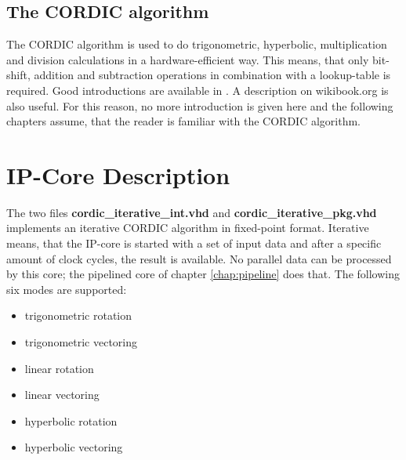 \documentclass[a4paper, 12pt, notitlepage]{report}
\newcommand{\file}[1]{\textbf{#1}}
\begin{document}
\section{The CORDIC algorithm}

The CORDIC algorithm is used to do trigonometric, hyperbolic, multiplication 
and division calculations in a hardware-efficient way. This means, that
only bit-shift, addition and subtraction operations in combination
with a lookup-table is required.\newline
Good introductions are available in \cite{survey}\cite{vlsi}\cite{dawid}.
A description on wikibook.org \cite{wikibook} is also useful.
For this reason, no more introduction is given here and the following chapters assume, that
the reader is familiar with the CORDIC algorithm.


\chapter{IP-Core Description}

The two files \file{cordic\_iterative\_int.vhd} and \file{cordic\_iterative\_pkg.vhd}
implements an iterative CORDIC algorithm in fixed-point format. 
Iterative means, that the IP-core is started with a set of input data and after
a specific amount of clock cycles, the result is available. No parallel data
can be processed by this core; the pipelined core of chapter \ref{chap:pipeline}
does that. The 
following six modes are supported:
\begin{itemize}
   \item trigonometric rotation
   \item trigonometric vectoring
   \item linear rotation
   \item linear vectoring
   \item hyperbolic rotation
   \item hyperbolic vectoring
\end{itemize}
\end{document}
